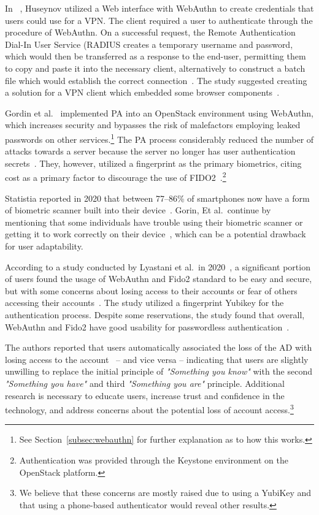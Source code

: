 In ~\cite{huseynov2022passwordless}, Huseynov utilized a Web interface with
WebAuthn to create credentials that users could use for a VPN\@.
The client required a user to authenticate through the procedure of WebAuthn.
On a successful request, the Remote Authentication Dial-In User Service (RADIUS
creates a temporary username and password, which would then be transferred
as a response to the end-user, permitting them to copy and paste it into the
necessary client, alternatively to construct a batch file which would establish
the correct connection~\cite{huseynov2022passwordless}.
The study suggested creating a solution for a VPN client which embedded some
browser components~\cite{huseynov2022passwordless}.

Gordin et al.~\cite{gordin2021moving} implemented PA into an OpenStack
environment using WebAuthn, which increases security and bypasses the risk of
malefactors employing leaked passwords on other services.\footnote{
  See Section~\ref{subsec:webauthn} for further explanation as to how this
  works.
}
The PA process considerably reduced the number of attacks towards a server
because the server no longer has user authentication
secrets~\cite{gordin2021moving}.
They, however, utilized a fingerprint as the primary biometrics, citing cost as
a primary factor to discourage the use of
FIDO2~\cite{gordin2021moving}.\footnote{
  Authentication was provided through the Keystone environment on the OpenStack
  platform.
}

Statistia reported in 2020 that between 77--86\% of smartphones now have a form
of biometric scanner built into their
device~\cite{statista-biometric-transactions}.
Gorin, Et al.\ continue by mentioning that some individuals have trouble
using their biometric scanner or getting it to work correctly on their
device~\cite{gordin2021moving}, which can be a potential drawback for user
adaptability.

According to a study conducted by Lyastani et al.\ in
2020~\cite{ghrobany2020fido2}, a significant portion of users found the usage
of WebAuthn and Fido2 standard to be easy and secure, but with some concerns
about losing access to their accounts or fear of others accessing their
accounts~\cite{ghrobany2020fido2}.
The study utilized a fingerprint Yubikey for the authentication process.
Despite some reservations, the study found that overall, WebAuthn and Fido2
have good usability for passwordless authentication~\cite{ghrobany2020fido2}.

The authors reported that users automatically associated the loss of the AD with
losing access to the account~\cite{ghrobany2020fido2} -- and vice versa --
indicating that users are slightly unwilling to replace the initial principle of
\textit{"Something you know"} with the second \textit{"Something you have"} and
third \textit{"Something you are"} principle.
Additional research is necessary to educate users, increase trust and confidence
in the technology, and address concerns about the potential loss of account
access.\footnote{
  We believe that these concerns are mostly raised due to using a YubiKey
  and that using a phone-based authenticator would reveal other results.
}

